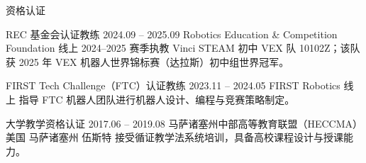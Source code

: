 \documentclass{resume}
\begin{document}
\begin{rSection}{资格认证}

\begin{hSubsection}
{REC 基金会认证教练}
{2024.09 -- 2025.09}
{Robotics Education \& Competition Foundation}
{线上}
{2024--2025 赛季执教 Vinci STEAM 初中 VEX 队 10102Z；该队获 2025 年 VEX 机器人世界锦标赛（达拉斯）初中组世界冠军。}
\end{hSubsection}

\begin{hSubsection}
{FIRST Tech Challenge（FTC）认证教练}
{2023.11 -- 2024.05}
{FIRST Robotics}
{线上}
{指导 FTC 机器人团队进行机器人设计、编程与竞赛策略制定。}
\end{hSubsection}

\begin{hSubsection}
{大学教学资格认证}
{2017.06 -- 2019.08}
{马萨诸塞州中部高等教育联盟（HECCMA）}
{美国 马萨诸塞州 伍斯特}
{接受循证教学法系统培训，具备高校课程设计与授课能力。}
\end{hSubsection}

\end{rSection}
\end{document}
